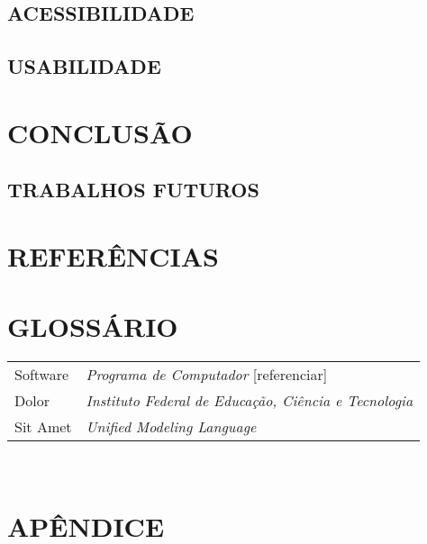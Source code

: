 \documentclass[12pt,a4paper]{article}
\begin{document}
			\lipsum[1]

		\subsection{ACESSIBILIDADE}

			\lipsum[1]

		\subsection{USABILIDADE}

			\lipsum[1]


	\section{CONCLUSÃO}

	\lipsum[1]

		\subsection{TRABALHOS FUTUROS}

			\lipsum[1]

	\newpage


	\section*{REFERÊNCIAS}

	\printbibliography[heading=none]

	\newpage

	\section*{GLOSSÁRIO}

	\begin{tabular}{p{3cm} p{}}
	  Software & \textit{Programa de Computador} [referenciar] \\
	  Dolor & \textit{Instituto Federal de Educação, Ciência e Tecnologia} \\
	  Sit Amet & \textit{Unified Modeling Language} \\
	\end{tabular}\\


	\newpage

	\section*{APÊNDICE}

	\lipsum[1]

	\newpage
\end{document}
